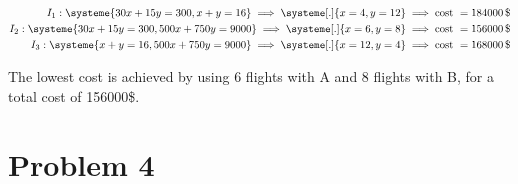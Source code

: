 \documentclass[a4paper, 10pt, twoside]{article}
\begin{document}
\begin{enumerate}[a)]
          \begin{align*}
              I_1 :
              \systeme{
                  30x+15y=300,
                  x+y=16
              }
              \implies
              \systeme[.]{
                  x=4,
                  y=12
              }
              \implies \text{cost } = 184000\,\$ \\
              I_2 :
              \systeme{
                  30x+15y=300,
                  500x+750y=9000
              }
              \implies
              \systeme[.]{
                  x=6,
                  y=8
              }
              \implies \text{cost } = 156000\,\$ \\
              I_3 :
              \systeme{
                  x+y=16,
                  500x+750y=9000
              }
              \implies
              \systeme[.]{
                  x=12,
                  y=4
              }
              \implies \text{cost } = 168000\,\$ \\
          \end{align*}

          The lowest cost is achieved by using 6 flights with A and 8 flights with B, for a total cost of 156000\$.

\end{enumerate}

\section*{Problem 4}
\end{document}
